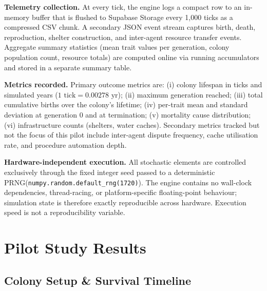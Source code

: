 \documentclass[12pt,a4paper]{article}
\begin{document}
\textbf{Telemetry collection.}
At every tick, the engine logs a compact row to an in-memory buffer that is flushed to Supabase Storage every 1,000 ticks as a compressed CSV chunk. A secondary JSON event stream captures birth, death, reproduction, shelter construction, and inter-agent resource transfer events. Aggregate summary statistics (mean trait values per generation, colony population count, resource totals) are computed online via running accumulators and stored in a separate summary table.

\textbf{Metrics recorded.}
Primary outcome metrics are: (i) colony lifespan in ticks and simulated years ($1\text{ tick} = 0.00278\text{ yr}$); (ii) maximum generation reached; (iii) total cumulative births over the colony's lifetime; (iv) per-trait mean and standard deviation at generation 0 and at termination; (v) mortality cause distribution; (vi) infrastructure counts (shelters, water caches). Secondary metrics tracked but not the focus of this pilot include inter-agent dispute frequency, cache utilisation rate, and procedure automation depth.

\textbf{Hardware-independent execution.}
All stochastic elements are controlled exclusively through the fixed integer seed passed to a deterministic PRNG\linebreak ({\texttt{numpy.random.default\_rng(1720)}}). The engine contains no wall-clock dependencies, thread-racing, or platform-specific floating-point behaviour; simulation state is therefore exactly reproducible across hardware. Execution speed is not a reproducibility variable.

\section{Pilot Study Results}

\subsection{Colony Setup \& Survival Timeline}
\end{document}
